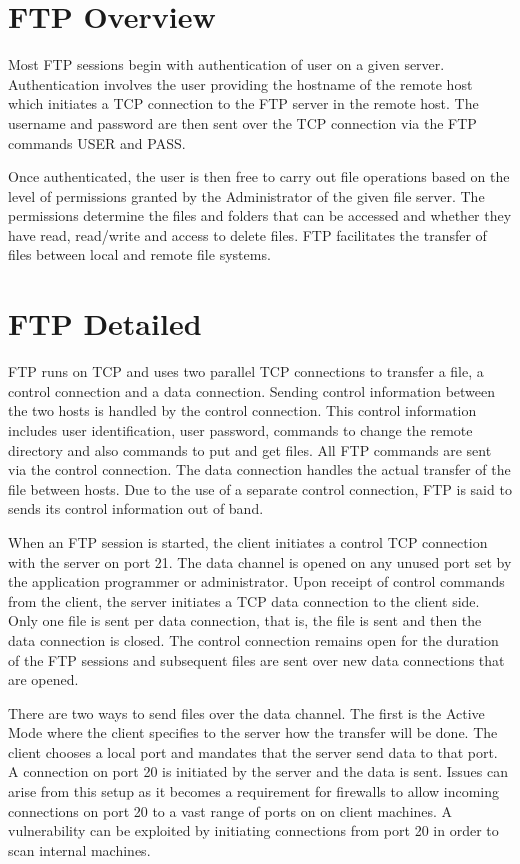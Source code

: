 \section{FTP Overview}
Most FTP sessions begin with authentication of user on a given server. Authentication involves the user providing the hostname of the remote host which initiates a TCP
connection to the FTP server in the remote host. The username and password are then sent over the TCP connection via the FTP commands USER and PASS. \par Once authenticated, the user
is then free to carry out file operations based on the level of permissions granted by the Administrator of the given file server. The permissions determine the files and folders
that can be accessed and whether they have read, read/write and access to delete files. FTP facilitates the transfer of files between local and remote file systems.

\section{FTP Detailed}
FTP runs on TCP and uses two parallel TCP connections to transfer a file, a control connection and a data connection. Sending control information between the two hosts is handled by the control connection.
This control information includes user identification, user password, commands to change the remote directory and also commands to put and get files. All FTP commands are sent via the control
connection. The data connection handles the actual transfer of the file between hosts. Due to the use of a separate control connection, FTP is said to sends its control information out of band.\par
When an FTP session is started, the client initiates a control TCP connection with the server on port 21. The data channel is opened on any unused port set by the application programmer or administrator.
Upon receipt of control commands from the client, the server initiates a TCP data connection to the client side. Only one file is sent per data connection, that is, the file is sent and then the data connection is closed.
The control connection remains open for the duration of the FTP sessions and subsequent files are sent over new data connections that are opened.

There are two ways to send files over the data channel. The first is the Active Mode where the client specifies to the server how the transfer will be done. The client chooses a local port
and mandates that the server send data to that port. A connection on port 20 is initiated by the server and the data is sent. Issues can arise from this setup as it becomes a requirement
for firewalls to allow incoming connections on port 20 to a vast range of ports on on client machines. A vulnerability can be exploited by initiating connections from port 20 in order to
scan internal machines.

